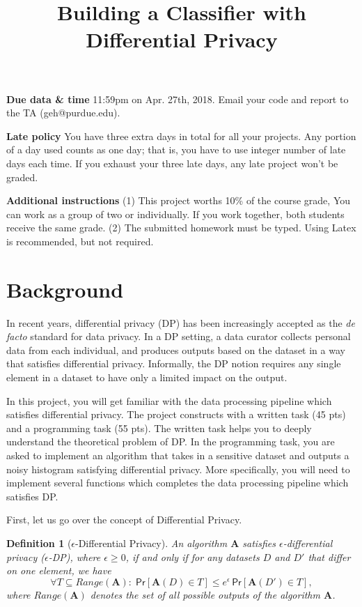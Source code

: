\documentclass{article}
\title{Building a Classifier with Differential Privacy}
\renewcommand{\AA}{\mathbf{A}}
\newtheorem{definition}{Definition}
\renewcommand{\Pr}[1]{\ensuremath{\mathsf{Pr}\left[#1\right]}\xspace}
\newcommand{\Data}{\ensuremath{D}\xspace}
\begin{document}
\maketitle


\noindent\textbf{Due data \& time} 11:59pm on Apr. 27th, 2018.  Email your code and report to the TA (geh@purdue.edu).

\noindent\textbf{Late policy} You have three extra days in total for all your projects. Any portion of a day used counts as one day; that is, you have to use integer number of late days each time. If you exhaust your three late days, any late project won’t be graded.

\noindent\textbf{Additional instructions} (1) This project worths 10\% of the course grade, You can work as a group of two or individually.  If you work together, both students receive the same grade.  (2) The submitted homework must be typed. Using Latex is recommended, but not required.

\section{Background}
In recent years, differential privacy (DP) has been increasingly accepted as the \textit{de facto} standard for data privacy.  In a DP setting, a data curator collects personal data from each individual, and produces outputs based on the dataset in a way that satisfies differential privacy. Informally, the DP notion requires any single element in a dataset to have only a limited impact on the output.

In this project, you will get familiar with the data processing pipeline which satisfies differential privacy. The project constructs with a written task (45 pts) and a programming task (55 pts). The written task helps you to deeply understand the theoretical problem of DP. In the programming task, you are asked to implement an algorithm that takes in a sensitive dataset and outputs a noisy histogram satisfying differential privacy. More specifically, you will need to implement several functions which completes the data processing pipeline which satisfies DP.

First, let us go over the concept of Differential Privacy.

\begin{definition}[$\epsilon$-Differential Privacy] \label{def:diff}
	An algorithm $\AA$ satisfies $\epsilon$-differential privacy ($\epsilon$-DP), where $\epsilon \geq 0$,
	if and only if for any datasets $\Data$ and $\Data'$ that \emph{differ on one element}, we have
	\begin{equation}
	\forall{T\subseteq\! \mathit{Range}(\AA)}:\; \Pr{\AA(\Data)\in T} \leq e^{\epsilon}\, \Pr{\AA(\Data')\in T},\label{eq:dp1}
	\end{equation}
	where $\mathit{Range}(\AA)$ denotes the set of all possible outputs of the algorithm $\AA$.
\end{definition}
\end{document}

